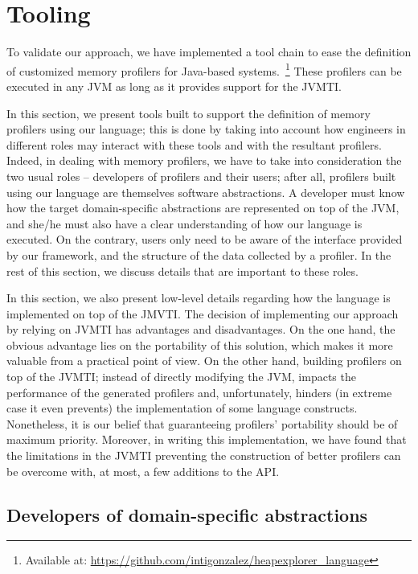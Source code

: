 \section{Tooling} \label{sec:dsl-implementation}

To validate our approach, we have implemented a tool chain to ease the definition of customized memory profilers for Java-based systems.~\footnote{Available at: \url{https://github.com/intigonzalez/heapexplorer\_language}}
These profilers can be executed in any JVM as long as it provides support for the JVMTI.

In this section, we present tools built to support the definition of memory profilers using our language; this is done by taking into account how engineers in different roles may interact with these tools and with the resultant profilers.
Indeed, in dealing with memory profilers, we have to take into consideration the two usual roles -- developers of profilers and their users; after all, profilers built using our language are themselves software abstractions.
A developer must know how the target domain-specific abstractions are represented on top of the JVM, and she/he must also have a clear understanding of how our language is executed.
On the contrary, users only need to be aware of the interface provided by our framework, and the structure of the data collected by a profiler.
In the rest of this section, we discuss details that are important to these roles.

In this section, we also present low-level details regarding how the language is implemented on top of the JMVTI.
The decision of implementing our approach by relying on JVMTI has advantages and disadvantages.
On the one hand, the obvious advantage lies on the portability of this solution, which makes it more valuable from a practical point of view.
On the other hand, building profilers on top of the JVMTI; instead of directly modifying the JVM, impacts the performance of the generated profilers and, unfortunately, hinders (in extreme case it even prevents) the implementation of some language constructs.
Nonetheless, it is our belief that guaranteeing profilers' portability should be of maximum priority.
Moreover, in writing this implementation, we have found that the limitations in the JVMTI preventing the construction of better profilers can be overcome with, at most, a few additions to the API.


\subsection{Developers of domain-specific abstractions}


